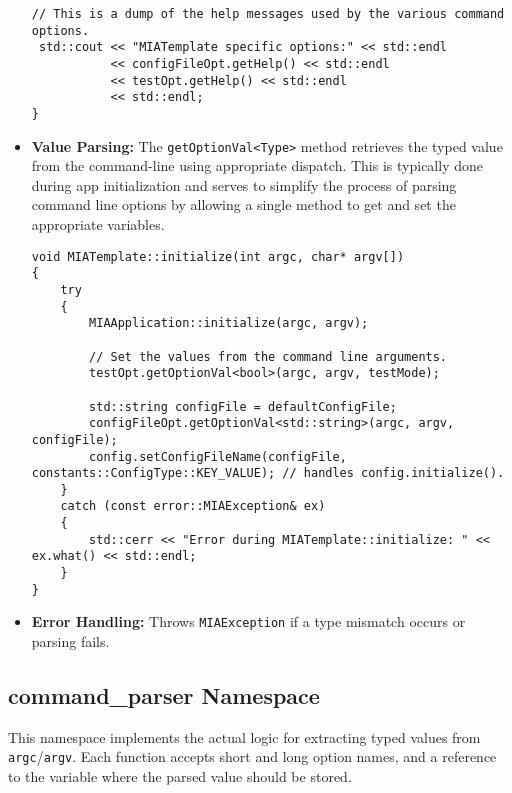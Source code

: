 \begin{itemize}
\begin{lstlisting}[style=cppstyle]
 // This is a dump of the help messages used by the various command options.
 std::cout << "MIATemplate specific options:" << std::endl
           << configFileOpt.getHelp() << std::endl
           << testOpt.getHelp() << std::endl
           << std::endl;
}
	\end{lstlisting}
	\item \textbf{Value Parsing:} The \texttt{getOptionVal<Type>} method retrieves the typed value from the command-line using appropriate dispatch. This is typically done during app initialization and serves to simplify the process of parsing command line options by allowing a single method to get and set the appropriate variables.
	\begin{lstlisting}[style=cppstyle]
void MIATemplate::initialize(int argc, char* argv[])
{
    try
    {    
        MIAApplication::initialize(argc, argv);

        // Set the values from the command line arguments.
        testOpt.getOptionVal<bool>(argc, argv, testMode);
        
        std::string configFile = defaultConfigFile;
        configFileOpt.getOptionVal<std::string>(argc, argv, configFile);
        config.setConfigFileName(configFile, constants::ConfigType::KEY_VALUE); // handles config.initialize().
    }
    catch (const error::MIAException& ex)
    {
        std::cerr << "Error during MIATemplate::initialize: " << ex.what() << std::endl;
    }
}
	\end{lstlisting}
	
	\item \textbf{Error Handling:} Throws \texttt{MIAException} if a type mismatch occurs or parsing fails.
\end{itemize}

\subsection{command\_parser Namespace}

This namespace implements the actual logic for extracting typed values from \texttt{argc}/\texttt{argv}. Each function accepts short and long option names, and a reference to the variable where the parsed value should be stored.

